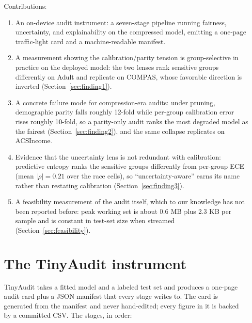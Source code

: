 \documentclass{article}
\begin{document}
Contributions:
\begin{enumerate}
  \item An on-device audit instrument: a seven-stage pipeline running fairness, uncertainty, and explainability on the compressed model, emitting a one-page traffic-light card and a machine-readable manifest.
  \item A measurement showing the calibration/parity tension is group-selective in practice on the deployed model: the two lenses rank sensitive groups differently on Adult and replicate on COMPAS, whose favorable direction is inverted (Section~\ref{sec:finding1}).
  \item A concrete failure mode for compression-era audits: under pruning, demographic parity falls roughly 12-fold while per-group calibration error rises roughly 10-fold, so a parity-only audit ranks the most degraded model as the fairest (Section~\ref{sec:finding2}), and the same collapse replicates on ACSIncome.
  \item Evidence that the uncertainty lens is not redundant with calibration: predictive entropy ranks the sensitive groups differently from per-group ECE (mean $|\rho| = 0.21$ over the race cells), so ``uncertainty-aware'' earns its name rather than restating calibration (Section~\ref{sec:finding3}).
  \item A feasibility measurement of the audit itself, which to our knowledge has not been reported before: peak working set is about 0.6 MB plus 2.3 KB per sample and is constant in test-set size when streamed (Section~\ref{sec:feasibility}).
\end{enumerate}

\section{The TinyAudit instrument}

TinyAudit takes a fitted model and a labeled test set and produces a one-page audit card plus a JSON manifest that every stage writes to. The card is generated from the manifest and never hand-edited; every figure in it is backed by a committed CSV. The stages, in order:
\end{document}
